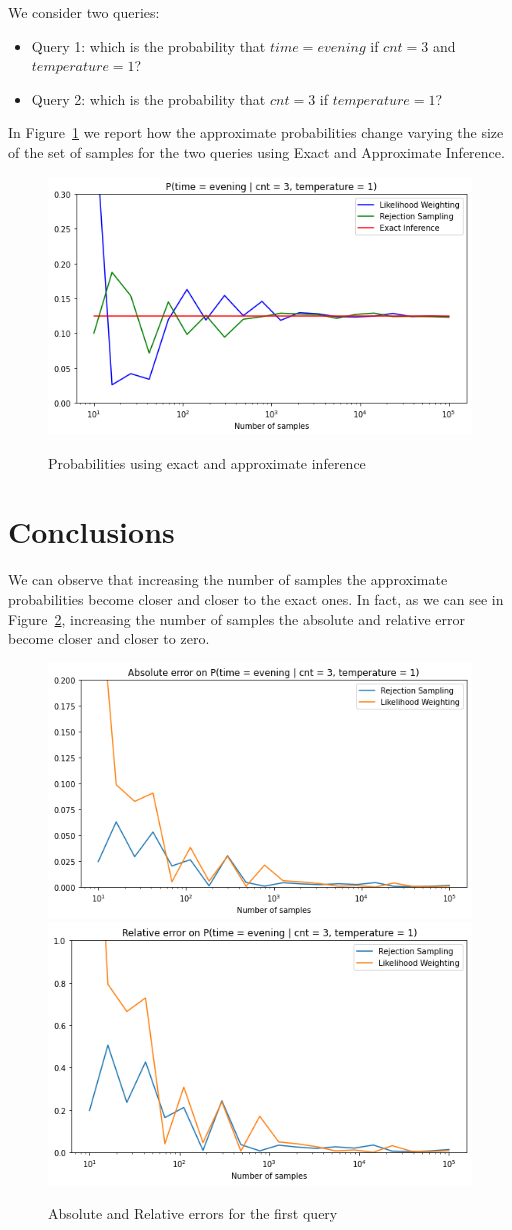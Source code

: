 \documentclass[letterpaper,11pt]{article}
\begin{document}
We consider two queries:
 \begin{itemize}
   \item Query 1: which is the probability that $time = evening$ if $cnt = 3$ and $
    temperature = 1$?
   \item Query 2: which is the probability that  $cnt = 3$ if $
   temperature = 1$?\\
 \end{itemize}
 In Figure~\ref{fig:prob} we report how the approximate probabilities change varying the size of the
  set of samples for the two queries using Exact and Approximate Inference.\\

\begin{figure}[h]
\centering
{\includegraphics[width=.45\textwidth]{q1.png}} 
 \\
\caption{Probabilities using exact and approximate inference}
\label{fig:prob}
\end{figure}

\section{Conclusions}
We can observe that increasing the number of samples the approximate probabilities
become closer and closer to the exact ones. In fact, as we can see in 
Figure~\ref{fig:error}, increasing the number of samples
the absolute and relative error become closer and closer to zero.

\begin{figure}[h]
  \centering
  {\includegraphics[width=.45\textwidth]{ab_err.png}} \quad
  {\includegraphics[width=.45\textwidth]{rel_err.png}} \\
  \caption{Absolute and Relative errors for the first query}
  \label{fig:error}
  \end{figure}
\end{document}
